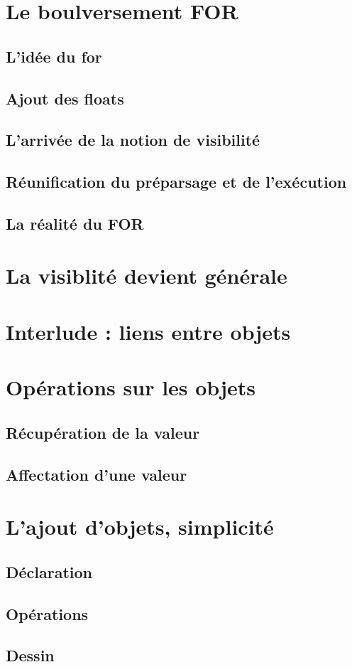 \documentclass[11pt]{report} %
\begin{document}
\section{Le boulversement FOR}
\subsection{L'idée du for}
\subsection{Ajout des floats}
\subsection{L'arrivée de la notion de visibilité}
\subsection{Réunification du préparsage et de l'exécution}
\subsection{La réalité du FOR}

\section{La visiblité devient générale}

\section{Interlude : liens entre objets}
\section{Opérations sur les objets}
\subsection{Récupération de la valeur}
\subsection{Affectation d'une valeur}

\section{L'ajout d'objets, simplicité}
\subsection{Déclaration}
\subsection{Opérations}
\subsection{Dessin}
\end{document}

